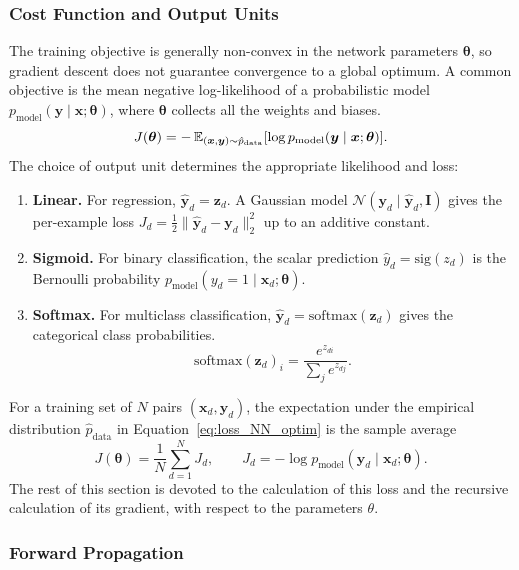 \subsubsection{Cost Function and Output Units}

The training objective is generally non-convex in the network parameters $\bm{\theta}$, so gradient descent does not guarantee convergence to a global optimum. A common objective is the mean negative log-likelihood of a probabilistic model $p_{\mathrm{model}}(\bm{y}\mid\bm{x};\bm{\theta})$, where $\bm{\theta}$ collects all the weights and biases.
\begin{equation}
	\label{eq:loss_NN_optim}
	J(\bm{\theta}) = -\operatorname{\mathbb{E}}_{(\bm{x},\bm{y}) \sim \hat{p}_{\mathrm{data}}} [\log p_{\mathrm{model}}(\bm{y}\mid\bm{x};\bm{\theta})].
\end{equation}
The choice of output unit determines the appropriate likelihood and loss:
\begin{enumerate}
	\item \textbf{Linear.} For regression, $\hat{\bm{y}}_d=\bm{z}_d$. A Gaussian model $\mathcal{N}(\bm{y}_d\mid\hat{\bm{y}}_d,\bm{I})$ gives the per-example loss $J_d=\frac12\|\hat{\bm{y}}_d-\bm{y}_d\|_2^2$ up to an additive constant.
	
	\item \textbf{Sigmoid.} For binary classification, the scalar prediction $\hat{y}_d=\mathrm{sig}(z_d)$ is the Bernoulli probability $p_{\mathrm{model}}(y_d=1\mid\bm{x}_d;\bm{\theta})$.
	
	\item \textbf{Softmax.} For multiclass classification, $\hat{\bm{y}}_d=\mathrm{softmax}(\bm{z}_d)$ gives the categorical class probabilities.
	\[
	\mathrm{softmax}(\bm{z}_d)_i = \frac{e^{z_{di}}}{\sum_j e^{z_{dj}}}.
	\]
\end{enumerate}

For a training set of $N$ pairs $(\bm{x}_d,\bm{y}_d)$, the expectation under the empirical distribution $\hat{p}_{\mathrm{data}}$ in Equation~\eqref{eq:loss_NN_optim} is the sample average
\begin{equation}
	\label{eq:loss_NN_optim_emp}
	J(\bm{\theta}) = \frac{1}{N}\sum_{d=1}^N J_d, \qquad
	J_d=-\log p_{\mathrm{model}}(\bm{y}_d\mid\bm{x}_d;\bm{\theta}).
\end{equation}
The rest of this section is devoted to the calculation of this loss and the recursive calculation of its gradient, with respect to the parameters $\theta$. 

\subsubsection{Forward Propagation}

